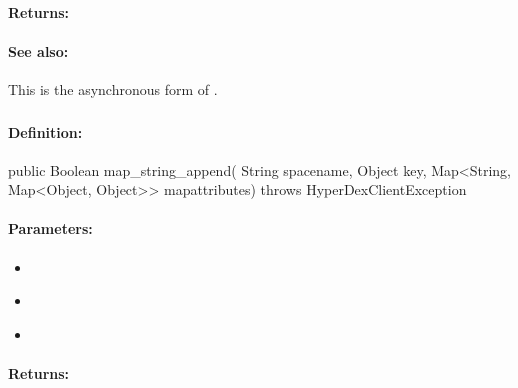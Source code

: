\paragraph{Returns:}


\paragraph{See also:}  This is the asynchronous form of .

\pagebreak
\subsubsection{}
\label{api:java:map_string_append}


\paragraph{Definition:}
\begin{javacode}
public Boolean map_string_append(
        String spacename,
        Object key,
        Map<String, Map<Object, Object>> mapattributes) throws HyperDexClientException
\end{javacode}

\paragraph{Parameters:}
\begin{itemize}[noitemsep]
\item {}\\

\item {}\\

\item {}\\

\end{itemize}

\paragraph{Returns:}


